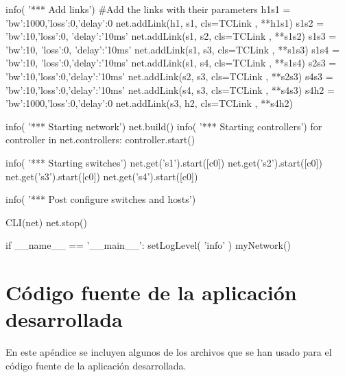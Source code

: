 \documentclass[a4paper,11pt]{book}
\begin{document}
\begin{python}
    info( '*** Add links\n') #Add the links with their parameters
    h1s1 = {'bw':1000,'loss':0,'delay':0}
    net.addLink(h1, s1, cls=TCLink , **h1s1)
    s1s2 = {'bw':10,'loss':0, 'delay':'10ms'}
    net.addLink(s1, s2, cls=TCLink , **s1s2)
    s1s3 = {'bw':10, 'loss':0, 'delay':'10ms'}
    net.addLink(s1, s3, cls=TCLink , **s1s3)
    s1s4 = {'bw':10, 'loss':0,'delay':'10ms'}
    net.addLink(s1, s4, cls=TCLink , **s1s4)
    s2s3 = {'bw':10,'loss':0,'delay':'10ms'}
    net.addLink(s2, s3, cls=TCLink , **s2s3)
    s4s3 = {'bw':10,'loss':0,'delay':'10ms'}
    net.addLink(s4, s3, cls=TCLink , **s4s3)
    s4h2 = {'bw':1000,'loss':0,'delay':0}
    net.addLink(s3, h2, cls=TCLink , **s4h2)


    info( '*** Starting network\n')
    net.build()
    info( '*** Starting controllers\n')
    for controller in net.controllers:
        controller.start()

    info( '*** Starting switches\n')
    net.get('s1').start([c0])
    net.get('s2').start([c0])
    net.get('s3').start([c0])
    net.get('s4').start([c0])

    info( '*** Post configure switches and hosts\n')

    CLI(net)
    net.stop()

if __name__ == '__main__':
    setLogLevel( 'info' )
    myNetwork()

\end{python}

\newpage
\chapter{Código fuente de la aplicación desarrollada}\label{apeC}
En este apéndice se incluyen algunos de los archivos que se han usado para el código fuente de la aplicación desarrollada.
\end{document}
